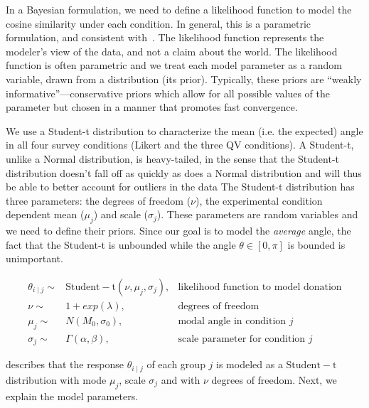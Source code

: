 In a Bayesian formulation, we need to define a likelihood function to model the cosine similarity under each condition. In general, this is a parametric formulation, and consistent with~\textcite{McElreath2015}. The likelihood function represents the modeler's view of the data, and not a claim about the world. The likelihood function is often parametric and we treat each model parameter as a random variable, drawn from a distribution (its prior). Typically, these priors are ``weakly informative''---conservative priors which allow for all possible values of the parameter but chosen in a manner that promotes fast convergence.


We use a Student-t distribution to characterize the mean (i.e. the expected) angle in all four survey conditions (Likert and the three QV conditions). A Student-t, unlike a Normal distribution, is heavy-tailed, in the sense that the Student-t distribution doesn't fall off as quickly as does a Normal distribution and will thus be able to better account for outliers in the data {} The Student-t distribution has three parameters: the degrees of freedom ($\nu$), the experimental condition dependent mean ($\mu_j$) and scale ($\sigma_j$).  These parameters are random variables and we need to define their priors. Since our goal is to model the \textit{average} angle, the fact that the Student-t is unbounded while the angle $\theta \in [0, \pi]$ is bounded is unimportant.

\begin{align}
  \theta_{i \mid j} \sim & \mathrm{Student-t}(\nu, \mu_j, \sigma_j),   & \text{likelihood function to model donation} \label{eq:bayesian formulation} \\
  \nu \sim & 1 + exp(\lambda), & \text{degrees of freedom} \\
  \mu_j \sim & N(M_0, \sigma_0), & \text{modal angle in condition } j \\
  \sigma_j \sim & \Gamma(\alpha, \beta), & \text{scale parameter for condition } j
\end{align}
 
 describes that the response $\theta_{i \mid j}$ of each group $j$ is modeled as a $\mathrm{Student-t}$ distribution with mode $\mu_j$,  scale $\sigma_j$ and with $\nu$ degrees of freedom. Next, we explain the model parameters.


